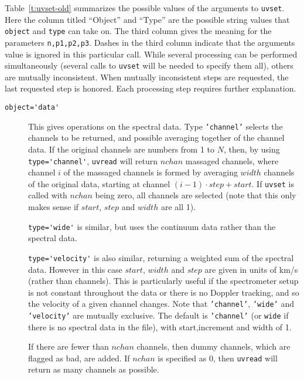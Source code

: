 Table~\ref{t:uvset-old} summarizes the possible values of the arguments to {\tt uvset}.
Here the column titled ``Object'' and ``Type'' are the possible string
values that {\tt object} and {\tt type} can take on. The third column
gives the meaning for the parameters \verb+n,p1,p2,p3+.
Dashes in the third column indicate that the arguments value is ignored in
this particular call. While several processing can be performed
simultaneously (several calls to {\tt uvset} will be needed to specify them
all), others are mutually inconsistent. When mutually inconsistent
steps are requested, the last requested step is honored. Each processing
step requires further explanation. 
\begin{description}
\item[\verb+object='data'+] This gives operations on the spectral
data. Type {\tt 'channel'} selects the channels to be returned, and possible
averaging together of the channel data. If the original channels are
numbers from 1 to $N$, then, by using \verb+type='channel'+, {\tt uvread} will
return $nchan$ massaged channels, where channel $i$ of the massaged channels
is formed by averaging $width$ channels of the original data, starting at
channel $(i-1)\cdot step + start$. If {\tt uvset} is
called with $nchan$ being zero, all channels are selected (note that this
only makes sense if $start$, $step$ and $width$ are all 1).

\verb+type='wide'+ is similar, but
uses the continuum data rather than the spectral data.

\verb+type='velocity'+ is also
similar, returning a weighted sum of the spectral data. However in this
case $start$, $width$ and $step$ are given in units of
km/s (rather than channels). This is particularly useful if the
spectrometer setup is not constant throughout the data or there is no
Doppler tracking, and so the velocity of a given channel changes.
Note that {\tt 'channel'}, {\tt 'wide'} and {\tt 'velocity'} are
mutually exclusive. The default is {\tt 'channel'} (or {\tt wide} if there is
no spectral data in the file), with start,increment
and width of 1.

If there are fewer than $nchan$ channels, then dummy channels, which are
flagged as bad, are added. If $nchan$ is specified as 0, then {\tt uvread}
will return as many channels as possible.


\end{description}
